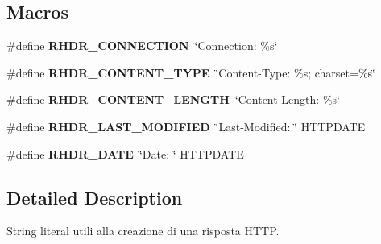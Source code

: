 \subsection*{Macros}
\begin{DoxyCompactItemize}
\item 
\hypertarget{group__RHDR_gacc0efd1b928f57223437c48dd2407a0f}{}\#define {\bfseries R\+H\+D\+R\+\_\+\+C\+O\+N\+N\+E\+C\+T\+I\+O\+N}~\char`\"{}Connection\+: \%s\char`\"{}\label{group__RHDR_gacc0efd1b928f57223437c48dd2407a0f}

\item 
\hypertarget{group__RHDR_ga4c9c30f434da8422e1df4e496738d623}{}\#define {\bfseries R\+H\+D\+R\+\_\+\+C\+O\+N\+T\+E\+N\+T\+\_\+\+T\+Y\+P\+E}~\char`\"{}Content-\/Type\+: \%s; charset=\%s\char`\"{}\label{group__RHDR_ga4c9c30f434da8422e1df4e496738d623}

\item 
\hypertarget{group__RHDR_gaffac7b401e575c62b6ad921e58aeddbe}{}\#define {\bfseries R\+H\+D\+R\+\_\+\+C\+O\+N\+T\+E\+N\+T\+\_\+\+L\+E\+N\+G\+T\+H}~\char`\"{}Content-\/Length\+: \%s\char`\"{}\label{group__RHDR_gaffac7b401e575c62b6ad921e58aeddbe}

\item 
\hypertarget{group__RHDR_ga753afe5dd87cbac07c208ca6687d037f}{}\#define {\bfseries R\+H\+D\+R\+\_\+\+L\+A\+S\+T\+\_\+\+M\+O\+D\+I\+F\+I\+E\+D}~\char`\"{}Last-\/Modified\+: \char`\"{} H\+T\+T\+P\+D\+A\+T\+E\label{group__RHDR_ga753afe5dd87cbac07c208ca6687d037f}

\item 
\hypertarget{group__RHDR_gad59b950287aa9c35c83da4db4e475e99}{}\#define {\bfseries R\+H\+D\+R\+\_\+\+D\+A\+T\+E}~\char`\"{}Date\+: \char`\"{} H\+T\+T\+P\+D\+A\+T\+E\label{group__RHDR_gad59b950287aa9c35c83da4db4e475e99}

\end{DoxyCompactItemize}


\subsection{Detailed Description}
String literal utili alla creazione di una risposta H\+T\+T\+P. 

